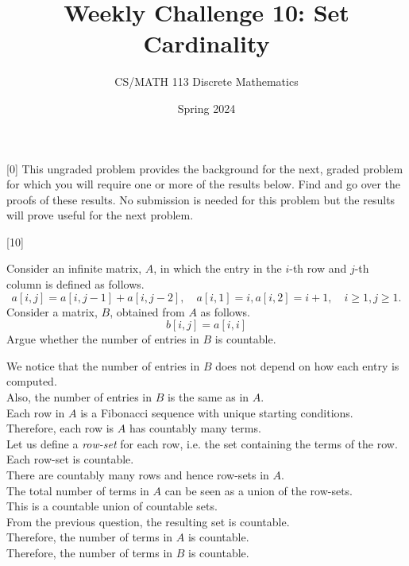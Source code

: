 \documentclass[a4paper]{exam}
\title{Weekly Challenge 10: Set Cardinality}
\author{CS/MATH 113 Discrete Mathematics}
\date{Spring 2024}
\begin{document}
\maketitle

\begin{questions}

[0]
  This ungraded problem provides the background for the next, graded problem for which you will require one or more of the results below. Find and go over the proofs of these results. No submission is needed for this problem but the results will prove useful for the next problem.
  


[10]

  Consider an infinite matrix, $A$, in which the entry in the $i$-th row and $j$-th column is defined as follows.
  \[
    a[i,j] = a[i,j-1] + a[i,j-2], \quad a[i,1] = i, a[i,2] = i+1, \quad i\geq 1, j\geq 1.
  \]
  Consider a matrix, $B$, obtained from $A$ as follows.
  \[
    b[i,j]= a[i,i]
  \]
  Argue whether the number of entries in $B$ is countable.
  
  \begin{solution}
    We notice that the number of entries in $B$ does not depend on how each entry is computed.\\
    Also, the number of entries in $B$ is the same as in $A$.\\
    Each row in $A$ is a Fibonacci sequence with unique starting conditions.\\
    Therefore, each row is $A$ has countably many terms.\\
    Let us define a \textit{row-set} for each row, i.e. the set containing the terms of the row.\\
    Each row-set is countable.\\
    There are countably many rows and hence row-sets in $A$.\\
    The total number of terms in $A$ can be seen as a union of the row-sets.\\
    This is a countable union of countable sets.\\
    From the previous question, the resulting set is countable.\\
    Therefore, the number of terms in $A$ is countable.\\
    Therefore, the number of terms in $B$ is countable.
  \end{solution}

\end{questions}
\end{document}
